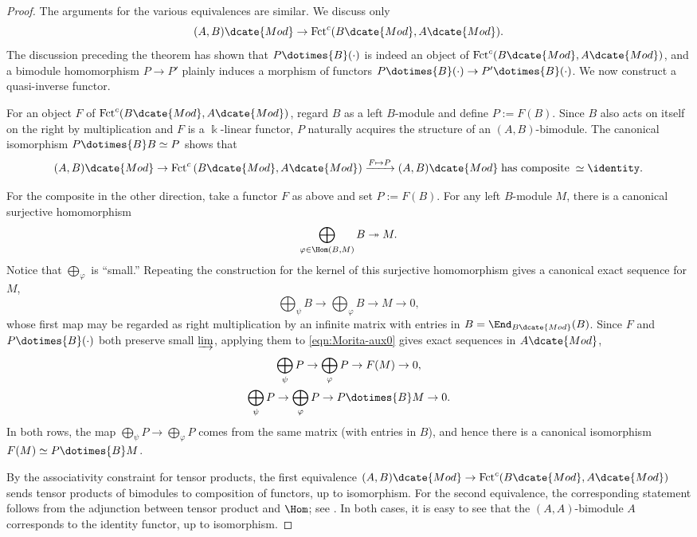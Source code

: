 \begin{proof}
	The arguments for the various equivalences are similar. We discuss only
	\[ (A, B)\dcate{Mod} \to \mathrm{Fct}^c(B\dcate{Mod}, A\dcate{Mod}). \]
	The discussion preceding the theorem has shown that
	$P\dotimes{B}(\mathord\cdot)$ is indeed an object of
	$\mathrm{Fct}^c(B\dcate{Mod},A\dcate{Mod})$, and a bimodule homomorphism
	$P\to P'$ plainly induces a morphism of functors
	$P\dotimes{B}(\mathord\cdot)\to P'\dotimes{B}(\mathord\cdot)$. We now
	construct a quasi-inverse functor.

	For an object $F$ of
	$\mathrm{Fct}^c(B\dcate{Mod},A\dcate{Mod})$, regard $B$ as a left
	$B$-module and define $P:=F(B)$. Since $B$ also acts on itself on the
	right by multiplication and $F$ is a $\Bbbk$-linear functor, $P$
	naturally acquires the structure of an $(A,B)$-bimodule. The canonical
	isomorphism $P\dotimes{B}B\simeq P$ shows that
	\[ (A, B)\dcate{Mod} \to \mathrm{Fct}^c\left(B\dcate{Mod}, A\dcate{Mod} \right) \xrightarrow{F \mapsto P} (A, B)\dcate{Mod} \;\text{has composite}\; \simeq \identity. \]

	For the composite in the other direction, take a functor $F$ as above and
	set $P:=F(B)$. For any left $B$-module $M$, there is a canonical
	surjective homomorphism
	\[ \bigoplus_{\varphi \in \Hom(B, M)} B \twoheadrightarrow M. \]
	Notice that $\bigoplus_\varphi$ is ``small.'' Repeating the construction
	for the kernel of this surjective homomorphism gives a canonical exact
	sequence for $M$,
	\begin{equation}\label{eqn:Morita-aux0}
		\bigoplus_\psi B \to \bigoplus_\varphi B \to M \to 0,
	\end{equation}
	whose first map may be regarded as right multiplication by an infinite
	matrix with entries in $B=\End_{B\dcate{Mod}}(B)$. Since $F$ and
	$P\dotimes{B}(\mathord\cdot)$ both preserve small $\varinjlim$, applying
	them to \eqref{eqn:Morita-aux0} gives exact sequences in
	$A\dcate{Mod}$,
	\begin{gather*}
		\bigoplus_\psi P \to \bigoplus_\varphi P \to F(M) \to 0, \\
		\bigoplus_\psi P \to \bigoplus_\varphi P \to P \dotimes{B} M \to 0.
	\end{gather*}
	In both rows, the map
	$\bigoplus_\psi P\to\bigoplus_\varphi P$ comes from the same matrix
	(with entries in $B$), and hence there is a canonical isomorphism
	$F(M)\simeq P\dotimes{B}M$.

	By the associativity constraint for tensor products, the first equivalence
	$(A,B)\dcate{Mod}\to\mathrm{Fct}^c(B\dcate{Mod},A\dcate{Mod})$ sends
	tensor products of bimodules to composition of functors, up to
	isomorphism. For the second equivalence, the corresponding statement
	follows from the adjunction between tensor product and $\Hom$; see
	\cite[Theorem 6.6.5]{Li1}. In both cases, it is easy to see that the
	$(A,A)$-bimodule $A$ corresponds to the identity functor, up to
	isomorphism.
\end{proof}

